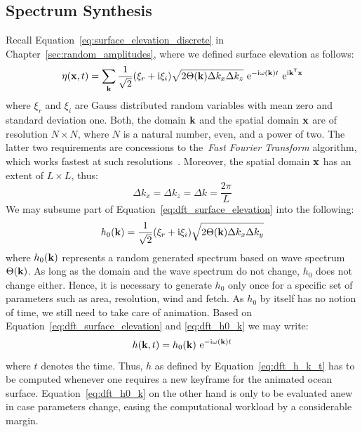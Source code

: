 \subsection{Spectrum Synthesis}
Recall Equation~\ref{eq:surface_elevation_discrete} in Chapter~\ref{sec:random_amplitudes},
where we defined surface elevation as follows:
\begin{equation}
\label{eq:dft_surface_elevation}
\eta(\mathbf{x}, t) = 
\sum_{\mathbf{k}}\frac{1}{\sqrt{2}}(\xi_r+\mathrm{i}\xi_i)
\sqrt{2\Theta(\mathbf{k})\Delta k_x \Delta k_z} 
~\mathrm{e}^{-\mathrm{i}\omega(\mathbf{k})t}
~\mathrm{e}^{\mathrm{i}\mathbf{k}^{\mathsf{T}}\mathbf{x}}
\end{equation}
where $\xi_r$ and $\xi_i$ are Gauss distributed random variables with mean zero 
and standard deviation one. Both, the \wavevector domain $\mathbf{k}$ and the
spatial domain $\mathbf{x}$ are of resolution $N \times N$, where $N$ is a natural
number, even, and a power of two. The latter two requirements are concessions to
the~\emph{Fast Fourier Transform} algorithm, which works fastest at such
resolutions~\citep{Cooley:1965}.
Moreover, the spatial domain $\mathbf{x}$ has an extent of $L \times L$, thus:
\begin{equation*}
	\Delta k_x = \Delta k_z = \Delta k = \frac{2\pi}{L}
\end{equation*}
We may subsume part of Equation~\ref{eq:dft_surface_elevation} into the
following:
\begin{equation}
\label{eq:dft_h0_k}
h_0(\mathbf{k}) = \frac{1}{\sqrt{2}}(\xi_r+\mathrm{i}\xi_i)\sqrt{2\Theta(\mathbf{k})\Delta k_x \Delta k_y}
\end{equation}
where $h_0(\mathbf{k})$ represents a random generated spectrum based on wave
spectrum $\Theta(\mathbf{k})$. As long as the \wavevector domain and the wave
spectrum do not change, $h_0$ does not change either. Hence, it is necessary to
generate $h_0$ only once for a specific set of parameters such as area,
resolution, wind and fetch. As $h_0$ by itself has no notion of time,
we still need to take care of animation. Based on Equation~\ref{eq:dft_surface_elevation}
and \ref{eq:dft_h0_k} we may write:
\begin{equation}
\label{eq:dft_h_k_t}
h(\mathbf{k},t) = h_0(\mathbf{k})~\mathrm{e}^{-\mathrm{i}\omega(\mathbf{k})t}
\end{equation}
where $t$ denotes the time.
Thus, $h$ as defined by Equation~\ref{eq:dft_h_k_t} has to be computed whenever
one requires a new keyframe for the animated ocean surface.
Equation~\ref{eq:dft_h0_k} on the other hand is only to be evaluated anew in
case parameters change, easing the computational workload by a
considerable margin.
%
